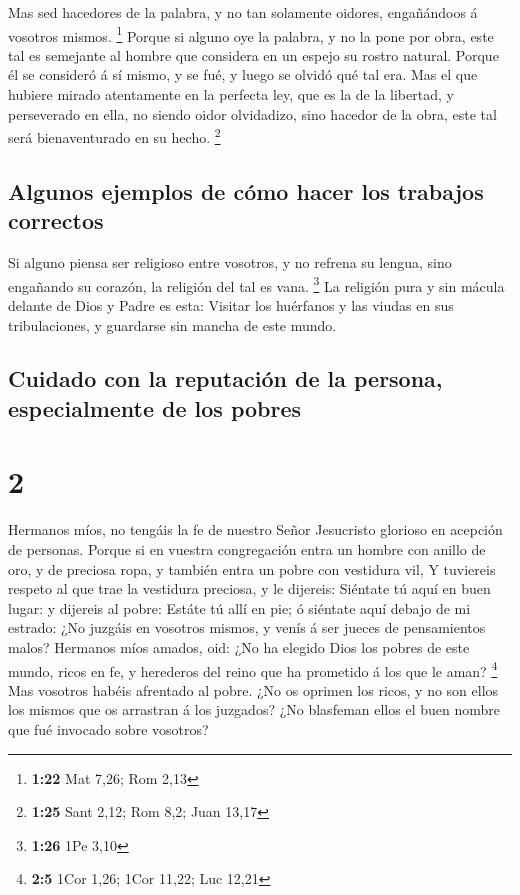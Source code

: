  Mas sed hacedores de la palabra, y no tan solamente
oidores, engañándoos á vosotros mismos. \footnote{\textbf{1:22} Mat
  7,26; Rom 2,13}  Porque si alguno oye la palabra, y no
la pone por obra, este tal es semejante al hombre que considera en un
espejo su rostro natural.  Porque él se consideró á sí
mismo, y se fué, y luego se olvidó qué tal era.  Mas el
que hubiere mirado atentamente en la perfecta ley, que es la de la
libertad, y perseverado en ella, no siendo oidor olvidadizo, sino
hacedor de la obra, este tal será bienaventurado en su hecho.
\footnote{\textbf{1:25} Sant 2,12; Rom 8,2; Juan 13,17}

\hypertarget{algunos-ejemplos-de-cuxf3mo-hacer-los-trabajos-correctos}{%
\subsection{Algunos ejemplos de cómo hacer los trabajos
correctos}\label{algunos-ejemplos-de-cuxf3mo-hacer-los-trabajos-correctos}}

 Si alguno piensa ser religioso entre vosotros, y no
refrena su lengua, sino engañando su corazón, la religión del tal es
vana. \footnote{\textbf{1:26} 1Pe 3,10}  La religión pura
y sin mácula delante de Dios y Padre es esta: Visitar los huérfanos y
las viudas en sus tribulaciones, y guardarse sin mancha de este mundo.

\hypertarget{cuidado-con-la-reputaciuxf3n-de-la-persona-especialmente-de-los-pobres}{%
\subsection{Cuidado con la reputación de la persona, especialmente de
los
pobres}\label{cuidado-con-la-reputaciuxf3n-de-la-persona-especialmente-de-los-pobres}}

\hypertarget{section-1}{%
\section{2}\label{section-1}}

 Hermanos míos, no tengáis la fe de nuestro Señor
Jesucristo glorioso en acepción de personas.  Porque si en
vuestra congregación entra un hombre con anillo de oro, y de preciosa
ropa, y también entra un pobre con vestidura vil,  Y
tuviereis respeto al que trae la vestidura preciosa, y le dijereis:
Siéntate tú aquí en buen lugar: y dijereis al pobre: Estáte tú allí en
pie; ó siéntate aquí debajo de mi estrado:  ¿No juzgáis en
vosotros mismos, y venís á ser jueces de pensamientos malos?
 Hermanos míos amados, oid: ¿No ha elegido Dios los pobres
de este mundo, ricos en fe, y herederos del reino que ha prometido á los
que le aman? \footnote{\textbf{2:5} 1Cor 1,26; 1Cor 11,22; Luc 12,21}
 Mas vosotros habéis afrentado al pobre. ¿No os oprimen
los ricos, y no son ellos los mismos que os arrastran á los juzgados?
 ¿No blasfeman ellos el buen nombre que fué invocado sobre
vosotros?

